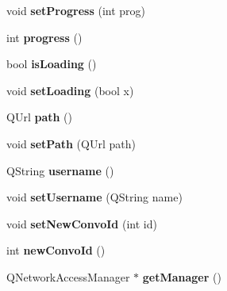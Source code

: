 \begin{DoxyCompactItemize}
\item 
\hypertarget{classHttpManager_a9206d907e4d69e607513f8098f00426b}{void {\bfseries set\-Progress} (int prog)}\label{classHttpManager_a9206d907e4d69e607513f8098f00426b}

\item 
\hypertarget{classHttpManager_a4d54d3e5b0af4ab49d9141674bee19e5}{int {\bfseries progress} ()}\label{classHttpManager_a4d54d3e5b0af4ab49d9141674bee19e5}

\item 
\hypertarget{classHttpManager_ad4d544319accae90e7d85cc9f57d360f}{bool {\bfseries is\-Loading} ()}\label{classHttpManager_ad4d544319accae90e7d85cc9f57d360f}

\item 
\hypertarget{classHttpManager_ac925a4bfdf4f7ba8525051fbe278800c}{void {\bfseries set\-Loading} (bool x)}\label{classHttpManager_ac925a4bfdf4f7ba8525051fbe278800c}

\item 
\hypertarget{classHttpManager_a3b8d9619b77e2c552e300d70564b3d7b}{Q\-Url {\bfseries path} ()}\label{classHttpManager_a3b8d9619b77e2c552e300d70564b3d7b}

\item 
\hypertarget{classHttpManager_ab9ccf94ca733e7a3308def32ec2216c5}{void {\bfseries set\-Path} (Q\-Url path)}\label{classHttpManager_ab9ccf94ca733e7a3308def32ec2216c5}

\item 
\hypertarget{classHttpManager_a81cf358de7d340343afe563e8d8bea55}{Q\-String {\bfseries username} ()}\label{classHttpManager_a81cf358de7d340343afe563e8d8bea55}

\item 
\hypertarget{classHttpManager_a00bfa7d52db2e6f4aee40ef66af1188f}{void {\bfseries set\-Username} (Q\-String name)}\label{classHttpManager_a00bfa7d52db2e6f4aee40ef66af1188f}

\item 
\hypertarget{classHttpManager_adcf8ced3a6d1c81e0c4017b1cc123766}{void {\bfseries set\-New\-Convo\-Id} (int id)}\label{classHttpManager_adcf8ced3a6d1c81e0c4017b1cc123766}

\item 
\hypertarget{classHttpManager_a974c08cbe0f522aab3bf0ff51ca37296}{int {\bfseries new\-Convo\-Id} ()}\label{classHttpManager_a974c08cbe0f522aab3bf0ff51ca37296}

\item 
\hypertarget{classHttpManager_aab5b2b37ca0a08fcc0ce0fb69996df34}{Q\-Network\-Access\-Manager $\ast$ {\bfseries get\-Manager} ()}\label{classHttpManager_aab5b2b37ca0a08fcc0ce0fb69996df34}


\end{DoxyCompactItemize}
